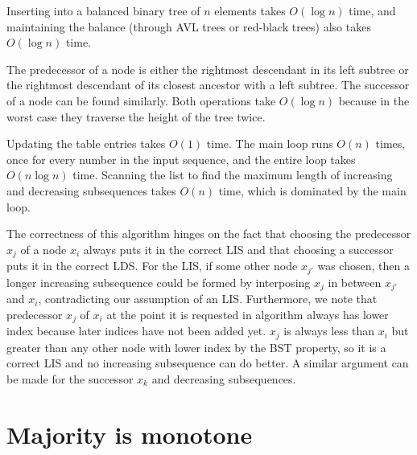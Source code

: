 \documentclass[12pt]{article}
\begin{document}
Inserting into a balanced binary tree of $n$ elements takes $O(\log{n})$ time,
and maintaining the balance (through AVL trees or red-black trees) also
takes $O(\log{n})$ time.

The predecessor of a node is either the rightmost descendant in its
left subtree  or the rightmost descendant of its closest ancestor with
a left subtree.
The successor of a node can be found similarly.
Both operations take $O(\log{n})$ because in the worst case they traverse
the height of the tree twice.

Updating the table entries takes $O(1)$ time. The main loop runs
$O(n)$ times, once for every number in the input sequence, and the
entire loop takes $O(n\log{n})$ time.
Scanning the list to find the maximum length of increasing and
decreasing subsequences takes $O(n)$ time, which is dominated by the
main loop.

The correctness of this algorithm hinges on the fact that choosing
the predecessor $x_j$ of a node $x_i$ always puts it in the correct LIS and
that choosing a successor puts it in the correct LDS.
For the LIS, if
some other node $x_{j'}$ was chosen,
then a longer increasing subsequence could be formed by
interposing $x_j$ in between $x_{j'}$ and $x_i$, contradicting our assumption
of an LIS.
Furthermore, we note that predecessor $x_j$
of $x_i$ at the point it is
requested in algorithm always has lower index because later indices
have not been added yet. $x_j$ is always less than $x_i$ but greater than
any other node with lower index by the BST property, so it is a correct
LIS and no increasing subsequence can do better.
A similar argument can be made for the successor $x_k$ and decreasing
subsequences.

\pagebreak

\section{Majority is monotone}
\end{document}
